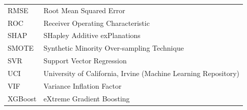 \begin{singlespace}
\begin{tabular}{@{}p{3.2cm}p{11cm}@{}}
RMSE & Root Mean Squared Error \\
ROC & Receiver Operating Characteristic \\
SHAP & SHapley Additive exPlanations \\
SMOTE & Synthetic Minority Over-sampling Technique \\
SVR & Support Vector Regression \\
UCI & University of California, Irvine (Machine Learning Repository) \\
VIF & Variance Inflation Factor \\
XGBoost & eXtreme Gradient Boosting \\
\end{tabular}
\end{singlespace}
